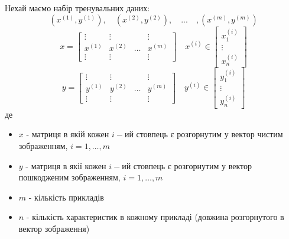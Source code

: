 \documentclass[14pt,a4paper]{extarticle}
\newcounter{e}
\numberwithin{equation}{section}
\numberwithin{figure}{section}
\newcommand{\ith}{^{(i)}}
\begin{document}
	Нехай маємо набір тренувальних даних:
	\begin{equation*}
		(x^{(1)}, y^{(1)}), \quad (x^{(2)}, y^{(2)}), \quad ... \quad ,(x^{(m)}, y^{(m)})
	\end{equation*}
	\begin{equation*}
		\quad
		x =	
		\begin{bmatrix}
			\vdots  & \vdots  & & \vdots \\
			x^{(1)} & x^{(2)} &   \dots & x^{(m)}\\
			\vdots  & \vdots  & & \vdots
		\end{bmatrix}
		\quad
		x\ith \in
		\begin{bmatrix}
			x\ith_1   \\
			\vdots \\
			x\ith_n
		\end{bmatrix}
		\quad
	\end{equation*}
	\begin{equation*}
		\quad
		y =	
		\begin{bmatrix}
			\vdots  & \vdots  & & \vdots \\
			y^{(1)} & y^{(2)} &   \dots & y^{(m)}\\
			\vdots  & \vdots  & & \vdots
		\end{bmatrix}
		\quad
		y\ith \in
		\begin{bmatrix}
			y\ith_1   \\
			\vdots \\
			y\ith_n
		\end{bmatrix}
		\quad
	\end{equation*}
	де
	\begin{itemize}
		\item $x$ - матриця в якій кожен $i-\text{ий}$ стовпець є розгорнутим у вектор чистим зображенням, $i=1,\dots,m$
		\item $y$ - матриця в якії кожен $i-\text{ий}$ стовпець є розгорнутим у вектор пошкодженим зображенням, $i=1,\dots,m$
		\item $m$ - кількість прикладів
		\item $n$ - кількість характеристик в кожному прикладі (довжина розгорнутого в вектор зображення)
	\end{itemize}
\end{document}

